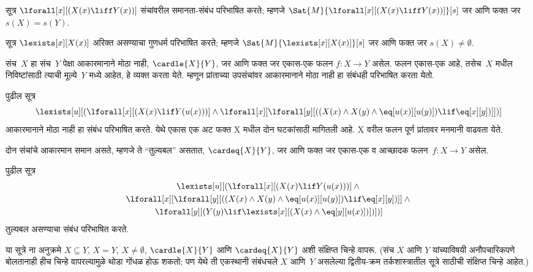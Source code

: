 \begin{prop}
सूत्र $\lforall[x][(X(x) \liff Y(x))]$ संचांवरील
समानता-संबंध परिभाषित करते; म्हणजे
$\Sat{M}{\lforall[x][(X(x) \liff Y(x))]}[s]$
जर आणि फक्त जर $s(X) = s(Y)$.
\end{prop}

\begin{prop}
सूत्र $\lexists[x][X(x)]$ अरिक्त असण्याचा
गुणधर्म परिभाषित करते; म्हणजे
$\Sat{M}{\lexists[x][X(x)]}[s]$
जर आणि फक्त जर $s(X) \neq \emptyset$.
\end{prop}

संच~$X$ हा संच~$Y$ पेक्षा आकारमानाने मोठा नाही,
$\cardle{X}{Y}$, जर आणि फक्त जर
एकास-एक फलन $f\colon X \to Y$ असेल.
फलन एकास-एक आहे, तसेच~$X$ मधील निविष्टांसाठी
त्याची मूल्ये~$Y$ मध्ये आहेत, हे व्यक्त करता येते.
म्हणून प्रांताच्या उपसंचांवर आकारमानाने मोठा नाही
हा संबंधही परिभाषित करता येतो.

\begin{prop}

पुढील सूत्र
\[\lexists[u][(\lforall[x][(X(x) \lif Y(u(x)))] \land \lforall[x][\lforall[y][((X(x) \land X(y) \land \eq[u(x)][u(y)]) \lif
      \eq[x][y])]])]
\]
आकारमानाने मोठा नाही हा संबंध परिभाषित करते. येथे
एकास एक अट फक्त X मधील दोन घटकांसाठी मागितली आहे.
X वरील फलन पूर्ण प्रांतावर मनमानी वाढवता येते.
\end{prop}

दोन संचांचे आकारमान समान असते, म्हणजे ते
``तुल्यबल'' असतात, $\cardeq{X}{Y}$, जर आणि
फक्त जर एकास-एक व आच्छादक फलन~$f\colon X \to Y$ असेल.

\begin{prop}
पुढील सूत्र
\begin{multline*}
  \lexists[u][(\lforall[x][(X(x) \lif Y(u(x)))] \land {}\\
    \lforall[x][\lforall[y][((X(x) \land X(y) \land \eq[u(x)][u(y)]) \lif \eq[x][y])]]
  \land {} \\\lforall[y][(Y(y) \lif \lexists[x][(X(x)
      \land \eq[y][u(x)])])])]
\end{multline*}
तुल्यबल असण्याचा संबंध परिभाषित करते.
\end{prop}

या सूत्रे ना अनुक्रमे $X \subseteq Y$,
$X = Y$, $X \neq \emptyset$, $\cardle{X}{Y}$
आणि $\cardeq{X}{Y}$ अशी संक्षिप्त चिन्हे वापरू.
(संच $X$ आणि $Y$ यांच्याविषयी अनौपचारिकपणे
बोलतानाही हीच चिन्हे वापरल्यामुळे थोडा गोंधळ होऊ शकतो;
पण येथे ती एकस्थानी संबंधचले $X$ आणि~$Y$
असलेल्या द्वितीय-क्रम तर्कशास्त्रातील सूत्रे
साठीची संक्षिप्त चिन्हे आहेत.)

